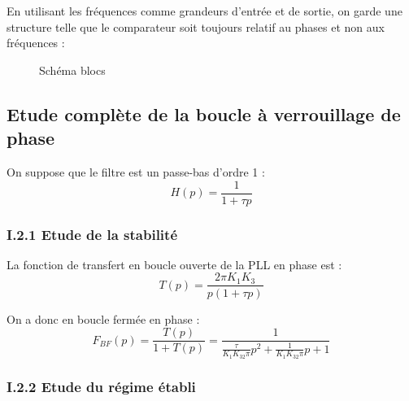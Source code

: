 \documentclass[../../Cours_M1.tex]{subfiles}
\begin{document}
En utilisant les fréquences comme grandeurs d'entrée et de sortie, on garde une structure telle que le comparateur soit toujours relatif au phases et non aux fréquences :

\begin{figure}[h!]
\centering
{}
\caption{Schéma blocs}
\end{figure}

\subsection{Etude complète de la boucle à verrouillage de phase}

On suppose que le filtre est un passe-bas d'ordre 1 :
\[H(p) = \frac{1}{1+\tau p} \]

\subsubsection*{I.2.1 Etude de la stabilité}

La fonction de transfert en boucle ouverte de la PLL en phase est :
\[T(p) = \frac{2\pi K_1 K_3}{p(1+\tau p)} \]

On a donc en boucle fermée en phase :
\[F_{BF}(p) = \frac{T(p)}{1+T(p)} = \frac{1}{\frac{\tau}{K_1K_32\pi}p^2+\frac{1}{K_1K_32\pi}p+1}\]

\subsubsection*{I.2.2 Etude du régime établi}
\end{document}

